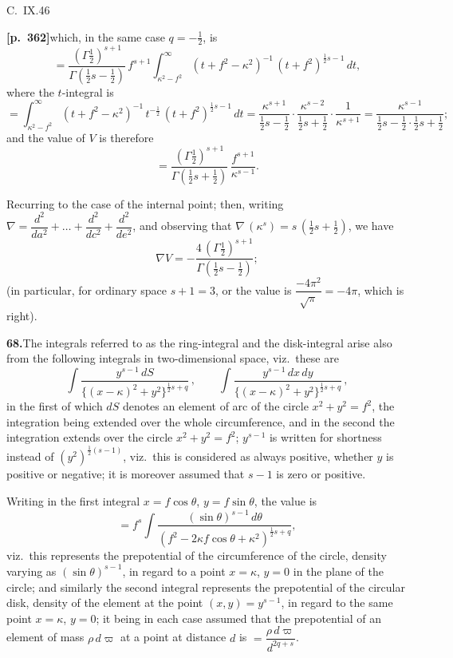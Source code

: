 \documentclass[11pt]{article}
\begin{document}
\hfill C.\ IX.\hfill 46

\bigskip

\noindent\textbf{[p.~362]}\quad which, in the same case $q=-\tfrac{1}{2}$, is
\[
= \frac{(\Gamma\tfrac{1}{2})^{s+1}}{\Gamma(\tfrac{1}{2}s-\tfrac{1}{2})}\,f^{s+1}\int_{\kappa^{2}-f^{2}}^{\infty}(t+f^{2}-\kappa^{2})^{-1}\,(t+f^{2})^{\frac{1}{2}s-1}\,dt,
\]
where the $t$-integral is
\[
= \int_{\kappa^{2}-f^{2}}^{\infty}(t+f^{2}-\kappa^{2})^{-1}\,t^{-\frac{1}{2}}\,(t+f^{2})^{\frac{1}{2}s-1}\,dt
= \frac{\kappa^{s+1}}{\tfrac{1}{2}s-\tfrac{1}{2}}\cdot\frac{\kappa^{s-2}}{\tfrac{1}{2}s+\tfrac{1}{2}}\cdot\frac{1}{\kappa^{s+1}} = \frac{\kappa^{s-1}}{\tfrac{1}{2}s-\tfrac{1}{2}\cdot\tfrac{1}{2}s+\tfrac{1}{2}};
\]
and the value of $V$ is therefore
\[
= \frac{(\Gamma\tfrac{1}{2})^{s+1}}{\Gamma(\tfrac{1}{2}s+\tfrac{1}{2})}\,\frac{f^{s+1}}{\kappa^{s-1}}.
\]

Recurring to the case of the internal point; then, writing $\nabla = \dfrac{d^{2}}{da^{2}}+\ldots+\dfrac{d^{2}}{dc^{2}}+\dfrac{d^{2}}{de^{2}}$, and observing that $\nabla\,(\kappa^{s}) = s\,(\tfrac{1}{2}s+\tfrac{1}{2})$, we have
\[
\nabla V = -\frac{4\,(\Gamma\tfrac{1}{2})^{s+1}}{\Gamma(\tfrac{1}{2}s-\tfrac{1}{2})};
\]
(in particular, for ordinary space $s+1=3$, or the value is $\dfrac{-4\pi^{2}}{\sqrt{\pi}}=-4\pi$, which is right).

\bigskip

\noindent\textbf{68.}\quad The integrals referred to as the ring-integral and the disk-integral arise also from the following integrals in two-dimensional space, viz.\ these are
\[
\int\frac{y^{s-1}\,dS}{\{(x-\kappa)^{2}+y^{2}\}^{\frac{1}{2}s+q}}\,,\qquad
\int\frac{y^{s-1}\,dx\,dy}{\{(x-\kappa)^{2}+y^{2}\}^{\frac{1}{2}s+q}}\,,
\]
in the first of which $dS$ denotes an element of arc of the circle $x^{2}+y^{2}=f^{2}$, the integration being extended over the whole circumference, and in the second the integration extends over the circle $x^{2}+y^{2}=f^{2}$; $y^{s-1}$ is written for shortness instead of $(y^{2})^{\frac{1}{2}(s-1)}$, viz.\ this is considered as always positive, whether $y$ is positive or negative; it is moreover assumed that $s-1$ is zero or positive.

Writing in the first integral $x=f\cos\theta$, $y=f\sin\theta$, the value is
\[
= f^{s}\int\frac{(\sin\theta)^{s-1}\,d\theta}{(f^{2}-2\kappa f\cos\theta+\kappa^{2})^{\frac{1}{2}s+q}},
\]
viz.\ this represents the prepotential of the circumference of the circle, density varying as $(\sin\theta)^{s-1}$, in regard to a point $x=\kappa$, $y=0$ in the plane of the circle; and similarly the second integral represents the prepotential of the circular disk, density of the element at the point $(x,y)=y^{s-1}$, in regard to the same point $x=\kappa$, $y=0$; it being in each case assumed that the prepotential of an element of mass $\rho\,d\varpi$ at a point at distance $d$ is $=\dfrac{\rho\,d\varpi}{d^{2q+s}}$.
\end{document}
